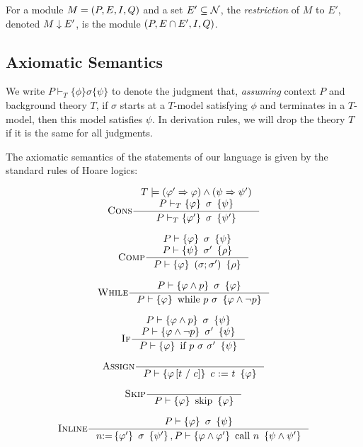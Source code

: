 \begin{definition}
  For a module $M = (P,E,I,Q)$ and a set $E' \subseteq \mathcal{N}$, the \emph{restriction} of
  $M$ to $E'$, denoted $M \downarrow E'$, is the module $(P,E \cap E',I,Q)$.
\end{definition}




\subsection{Axiomatic Semantics} \label{sec:axiom-sem}
We write $P \vdash_T \{\phi\}
\sigma \{\psi\}$ to denote the judgment that, \emph{assuming} context
$P$ and background theory $T$, if $\sigma$ starts at a $T$-model satisfying $\phi$ and terminates in a $T$-model, then this model satisfies $\psi$. In derivation rules, we
will drop the theory $T$ if it is the same for all judgments.


The axiomatic semantics of the statements of  our language is given by the standard rules of Hoare logics:

\begin{small}
\[\irule{Cons}\inference{T \models (\phi' \Rightarrow \phi) \wedge (\psi \Rightarrow \psi')\\
             P \vdash_T \bra{\phi} \sigma \ket{\psi}}
            {P \vdash_T \bra{\phi'} \sigma \ket{\psi'}}\]

\[\irule{Comp}\inference{P \vdash \bra{\phi} \sigma \ket{\psi}\\
             P \vdash \bra{\psi} \sigma' \ket{\rho}}
            {P \vdash \bra{\phi} (\sigma;\sigma') \ket{\rho}}\]

\[\irule{While}\inference{P \vdash \bra{\phi \wedge p} \sigma \ket{\phi}}
            {P \vdash \bra{\phi} \mbox{\rm while $p$ $\sigma$} \ket{\phi \wedge \neg p}}\]

\[\irule{If}\inference{P \vdash \bra{\phi \wedge p} \sigma \ket{\psi}\\
             P \vdash \bra{\phi \wedge \neg p} \sigma' \ket{\psi}}
            {P \vdash \bra{\phi} \mbox{\rm if $p$ $\sigma$ $\sigma'$} \ket{\psi}}\]

\[\irule{Assign}\inference{}
            {P \vdash \bra{\phi\left[ t ~/~ c\right]} c \ \Asgn\ t \ket{\phi}}\]

\[\irule{Skip}\inference{}
            {P \vdash \bra{\phi} \mbox{skip} \ket{\phi}}\]

\[{\irule{Inline}\inference{ P \vdash \bra{\phi} \sigma \ket{\psi} }
             { n \Asgn \bra{\phi'} \sigma \ket{\psi'}, P \vdash \bra{\phi\wedge \phi'} \mbox{\rm call $n$} \ket{\psi \wedge \psi'} }
}\]
\end{small}

